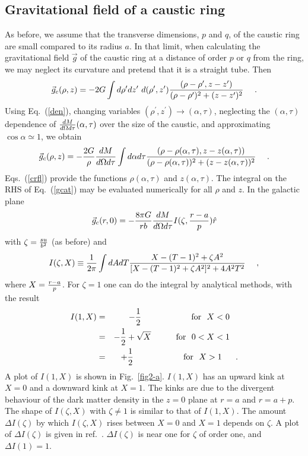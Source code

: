 \documentclass[aps,prd,preprint,tightenlines,floatfix,showpacs,groupedaddress]{revtex4}
\begin{document}
\subsection{Gravitational field of a caustic ring}

As before, we assume that the transverse dimensions, $p$ and $q$, 
of the caustic ring are small compared to its radius $a$.  In that 
limit, when calculating the gravitational field $\vec{g}$ of the 
caustic ring at a distance of order $p$ or $q$ from the ring, we
may neglect its curvature and pretend that it is a straight tube.
Then 
\begin{equation}
\vec{g}_c(\rho,z) = - 2 G \int d\rho^\prime dz^\prime~ 
d(\rho^\prime, z^\prime) 
{(\rho - \rho^\prime, z - z^\prime) \over 
(\rho - \rho^\prime)^2 + (z - z^\prime)^2}~~~\ .
\label{gcg}
\end{equation}
Using Eq.~(\ref{den}), changing variables 
$(\rho^\prime, z^\prime) \rightarrow (\alpha, \tau)$, 
neglecting the $(\alpha, \tau)$ dependence of 
${dM \over d\Omega d\tau} (\alpha, \tau)$ over the 
size of the caustic, and approximating $\cos \alpha \simeq 1$, 
we obtain
\begin{equation}
\vec{g}_c(\rho, z) = - {2 G \over \rho} {dM \over d\Omega d\tau}
\int d\alpha d\tau  
{(\rho - \rho(\alpha, \tau), z - z(\alpha, \tau)) \over
(\rho - \rho(\alpha, \tau))^2 + (z - z(\alpha, \tau))^2}~~~\ .
\label{gcat}
\end{equation}
Eqs.~(\ref{crfl}) provide the functions $\rho(\alpha, \tau)$
and $z(\alpha,\tau)$.  The integral on the RHS of Eq.~(\ref{gcat})
may be evaluated numerically for all $\rho$ and $z$.  In the 
galactic plane 
\begin{equation}
\vec{g}_c(r,0) = - {8 \pi G \over r b} {dM \over d\Omega d\tau}
I(\zeta, {r-a \over p}) \hat{r}
\label{gcr0}
\end{equation}
with $\zeta = {s u \over b^2}$ (as before) and 
\begin{equation}
I(\zeta,X) \equiv {1 \over 2 \pi} \int dA dT
{X - (T-1)^2 + \zeta A^2 \over 
[X - (T-1)^2 + \zeta A^2]^2 + 4 A^2 T^2}~~~\ ,
\label{IX}
\end{equation}
where $X = {r-a \over p}$.  For $\zeta = 1$ one can do the 
integral by analytical methods, with the result
\begin{eqnarray}
I(1,X) &=& - {1 \over 2}~~~~~~~~~~~~~~~~~~{\rm for}~~X<0~~~\nonumber\\
&=& - {1 \over 2} + \sqrt{X}~~~~~~~~~{\rm for}~~0<X<1~~~\nonumber\\
&=& + {1 \over 2}~~~~~~~~~~~~~~~~~~{\rm for}~~X>1~~~~\ .
\label{I1X}
\end{eqnarray}
A plot of $I(1,X)$ is shown in Fig.~\ref{fig2-a}.  $I(1,X)$ has 
an upward kink at $X=0$ and a downward kink at $X=1$.  The kinks
are due to the divergent behaviour of the dark matter density 
in the $z=0$ plane at $r=a$ and $r=a+p$.  The shape of $I(\zeta,X)$ 
with $\zeta \neq 1$ is similar to that of $I(1,X)$.  The amount 
$\Delta I(\zeta)$ by which $I(\zeta,X)$ rises between $X=0$ and 
$X=1$ depends on $\zeta$.  A plot of $\Delta I(\zeta)$ is given in 
ref.~\cite{sing}.  $\Delta I(\zeta)$ is near one for $\zeta$
of order one, and $\Delta I(1) = 1$.
\end{document}
